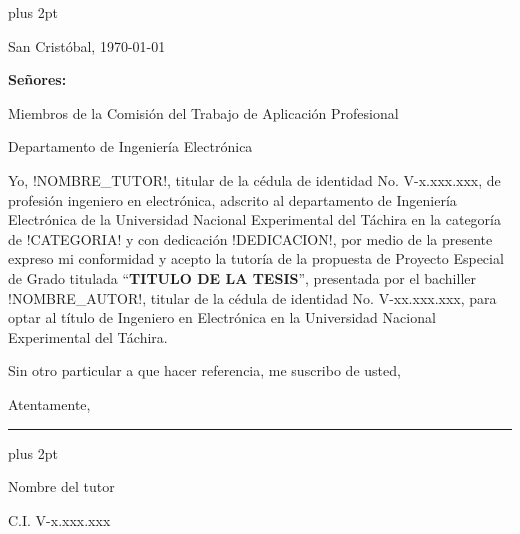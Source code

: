 % 

\begin{titlepage}
\parskip=7.25pt plus 2pt
\setcounter{page}{3}
\begin{flushright}
	San Cristóbal, \today
\end{flushright}

\vspace{1cm}
\vfill

\begin{flushleft}
		\singlespacing
		
		\setlength{\parskip}{0pt}
		
		\textbf{Señores:}
		
		Miembros de la Comisión del Trabajo de Aplicación Profesional
		
		Departamento de Ingeniería Electrónica
		
\end{flushleft}

\vfill
\begin{spacing}{1.5}
	Yo, !NOMBRE\_TUTOR!, titular de la cédula de identidad No. \mbox{V-x.xxx.xxx}, de profesión ingeniero en electrónica, adscrito al departamento de Ingeniería Electrónica de la Universidad Nacional Experimental del Táchira en la categoría de !CATEGORIA! y con dedicación !DEDICACION!, por medio de la presente expreso mi conformidad y acepto la tutoría de la propuesta de Proyecto Especial de Grado titulada \enquote{\textbf{TITULO DE LA TESIS}}, presentada por el bachiller !NOMBRE\_AUTOR!, titular de la cédula de identidad No. \mbox{V-xx.xxx.xxx}, para optar al título de Ingeniero en Electrónica en la Universidad Nacional Experimental del Táchira.
	
	Sin otro particular a que hacer referencia, me suscribo de usted,
	
	\setlength{\parskip}{20pt} 
	
	\noindent Atentamente,
\end{spacing}

\vfill

\begin{center}
	
	\rule{6cm}{1pt}
	
	\vspace{0.2cm}
	
	\parskip=0pt plus 2pt
    
    \begin{spacing}{1}    
        Nombre del tutor
    
        C.I. V-x.xxx.xxx
    \end{spacing}
\end{center}

\vspace{0.5cm}

\end{titlepage}